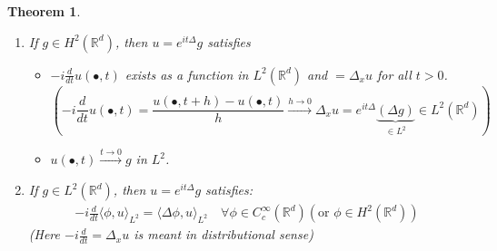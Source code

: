 \documentclass{report}
\theoremstyle{tommy}
\newtheorem{thm}[defn]{Theorem}
\begin{document}
  \begin{thm}
    \begin{enumerate}
      \item If \(g \in H^2(\mathbb{R}^d)\), then \(u = e^{it \Delta} g\) satisfies
      \begin{itemize}
        \item  \(-i \frac{d}{dt} u(\bullet, t)\) exists as a function in \(L^2(\mathbb{R}^d)\) and \(= \Delta_x u\) for all \(t > 0\).
        \[\left(- i \frac{d}{dt} u(\bullet, t) = \frac{u(\bullet, t+h) - u(\bullet, t)}{h} \xrightarrow{h \to 0} \Delta_x u = e^{it \Delta}\underbrace{(\Delta g)}_{\in L^2} \in L^2(\mathbb{R}^d)\right)\]
        \item \(u(\bullet, t) \xrightarrow{t \to 0} g\) in \(L^2\).
      \end{itemize}
      \item If \(g \in L^2(\mathbb{R}^d)\), then \(u = e^{it \Delta} g\) satisfies:
      \begin{align*}
        - i \frac{d}{dt} \langle \phi, u\rangle_{L^2} = \langle \Delta \phi, u\rangle_{L^2} \quad \forall \phi \in C_c^\infty(\mathbb{R}^d) (\text{or } \phi \in H^2(\mathbb{R}^d))
      \end{align*}     
      (Here \(-i \frac{d}{dt} = \Delta_x u\) is meant in distributional sense) 
    \end{enumerate}
  \end{thm}
\end{document}
